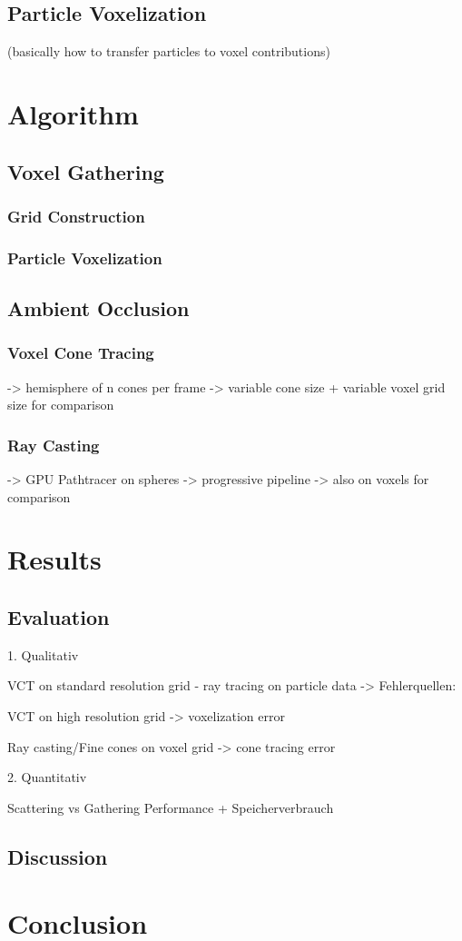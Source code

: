 \documentclass[hyperref,german,diplominf]{cgvpub}
\begin{document}
\section{Particle Voxelization}
(basically how to transfer particles to voxel contributions)

\chapter{Algorithm}

\section{Voxel Gathering}

\subsection{Grid Construction}

\subsection{Particle Voxelization}

\section{Ambient Occlusion}

\subsection{Voxel Cone Tracing}
-> hemisphere of n cones per frame
-> variable cone size + variable voxel grid size for comparison

\subsection{Ray Casting}
-> GPU Pathtracer on spheres
-> progressive pipeline
-> also on voxels for comparison

\chapter{Results}
\section{Evaluation}

1. Qualitativ

VCT on standard resolution grid - ray tracing on particle data -> Fehlerquellen:

VCT on high resolution grid -> voxelization error

Ray casting/Fine cones on voxel grid -> cone tracing error

2. Quantitativ

Scattering vs Gathering Performance + Speicherverbrauch

\section{Discussion}
\chapter{Conclusion}
\end{document}
